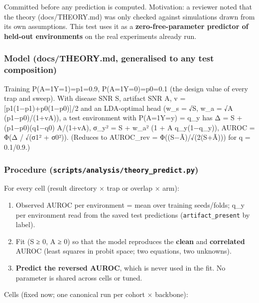 {\small
Committed before any prediction is computed. Motivation: a reviewer noted that the theory (docs/THEORY.md) was only
checked against simulations drawn from its own assumptions. This test uses it as a \textbf{zero-free-parameter predictor
of held-out environments} on the real experiments already run.

\subsubsection{Model (docs/THEORY.md, generalised to any test composition)}\label{model-docstheorymd-generalised-to-any-test-composition}

Training P(A=1\textbar Y=1)=p1=0.9, P(A=1\textbar Y=0)=p0=0.1 (the design value of every trap and sweep). With disease SNR S, artifact
SNR A, v = {[}p1(1−p1)+p0(1−p0){]}/2 and an LDA-optimal head (w\_s = √S, w\_a = √A (p1−p0)/(1+vA)), a test environment with
P(A=1\textbar Y=y) = q\_y has
Δ = S + (p1−p0)(q1−q0) A/(1+vA), σ\_y² = S + w\_a² (1 + A q\_y(1−q\_y)), AUROC = Φ(Δ / √(σ1² + σ0²)).
(Reduces to AUROC\_rev = Φ((S−Ã)/√(2(S+Ã))) for q = 0.1/0.9.)

\subsubsection{\texorpdfstring{Procedure (\texttt{scripts/analysis/theory\_predict.py})}{Procedure (scripts/analysis/theory\_predict.py)}}\label{procedure-scriptsanalysistheory_predictpy}

For every cell (result directory × trap or overlap × arm):

\begin{enumerate}
\def\labelenumi{\arabic{enumi}.}

\item
  Observed AUROC per environment = mean over training seeds/folds; q\_y per environment read from the saved test
  predictions (\texttt{artifact\_present} by label).
\item
  Fit (S ≥ 0, A ≥ 0) so that the model reproduces the \textbf{clean} and \textbf{correlated} AUROC (least squares in probit
  space; two equations, two unknowns).
\item
  \textbf{Predict the reversed AUROC}, which is never used in the fit. No parameter is shared across cells or tuned.
\end{enumerate}

Cells (fixed now; one canonical run per cohort × backbone):

\begin{itemize}


\end{itemize}}
